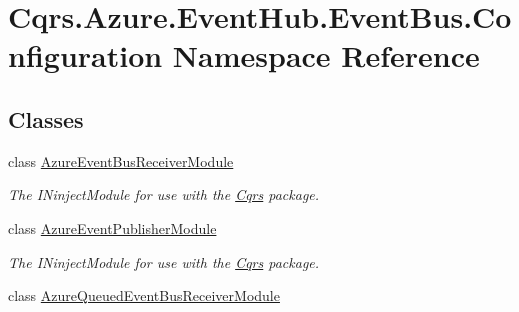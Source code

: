 \hypertarget{namespaceCqrs_1_1Azure_1_1EventHub_1_1EventBus_1_1Configuration}{}\section{Cqrs.\+Azure.\+Event\+Hub.\+Event\+Bus.\+Configuration Namespace Reference}
\label{namespaceCqrs_1_1Azure_1_1EventHub_1_1EventBus_1_1Configuration}
\subsection*{Classes}
\begin{DoxyCompactItemize}
\item 
class \hyperlink{classCqrs_1_1Azure_1_1EventHub_1_1EventBus_1_1Configuration_1_1AzureEventBusReceiverModule}{Azure\+Event\+Bus\+Receiver\+Module}
\begin{DoxyCompactList}\small\item\em The I\+Ninject\+Module for use with the \hyperlink{namespaceCqrs}{Cqrs} package. \end{DoxyCompactList}\item 
class \hyperlink{classCqrs_1_1Azure_1_1EventHub_1_1EventBus_1_1Configuration_1_1AzureEventPublisherModule}{Azure\+Event\+Publisher\+Module}
\begin{DoxyCompactList}\small\item\em The I\+Ninject\+Module for use with the \hyperlink{namespaceCqrs}{Cqrs} package. \end{DoxyCompactList}\item 
class \hyperlink{classCqrs_1_1Azure_1_1EventHub_1_1EventBus_1_1Configuration_1_1AzureQueuedEventBusReceiverModule}{Azure\+Queued\+Event\+Bus\+Receiver\+Module}
\end{DoxyCompactItemize}
